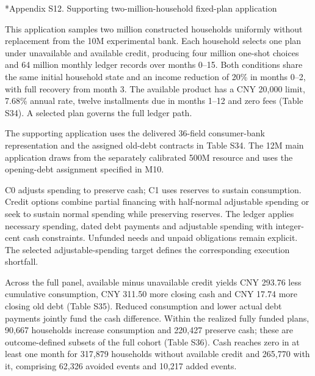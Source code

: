 \documentclass[10pt]{article}
\makeatletter
\renewcommand\section{\@startsection{section}{1}{\z@}{-2.2ex plus -1ex minus -.2ex}{.9ex plus .2ex}{\normalfont\large\mdseries}}
\makeatother
\begin{document}
\section*{Appendix S12. Supporting two-million-household fixed-plan application}

This application samples two million constructed households uniformly without replacement from the 10M experimental bank. Each household selects one plan under unavailable and available credit, producing four million one-shot choices and 64 million monthly ledger records over months 0--15. Both conditions share the same initial household state and an income reduction of 20\% in months 0--2, with full recovery from month 3. The available product has a CNY 20,000 limit, 7.68\% annual rate, twelve installments due in months 1--12 and zero fees (Table S34). A selected plan governs the full ledger path.

The supporting application uses the delivered 36-field consumer-bank representation and the assigned old-debt contracts in Table S34. The 12M main application draws from the separately calibrated 500M resource and uses the opening-debt assignment specified in M10.

C0 adjusts spending to preserve cash; C1 uses reserves to sustain consumption. Credit options combine partial financing with half-normal adjustable spending or seek to sustain normal spending while preserving reserves. The ledger applies necessary spending, dated debt payments and adjustable spending with integer-cent cash constraints. Unfunded needs and unpaid obligations remain explicit. The selected adjustable-spending target defines the corresponding execution shortfall.

Across the full panel, available minus unavailable credit yields CNY 293.76 less cumulative consumption, CNY 311.50 more closing cash and CNY 17.74 more closing old debt (Table S35). Reduced consumption and lower actual debt payments jointly fund the cash difference. Within the realized fully funded plans, 90,667 households increase consumption and 220,427 preserve cash; these are outcome-defined subsets of the full cohort (Table S36). Cash reaches zero in at least one month for 317,879 households without available credit and 265,770 with it, comprising 62,326 avoided events and 10,217 added events.
\end{document}
